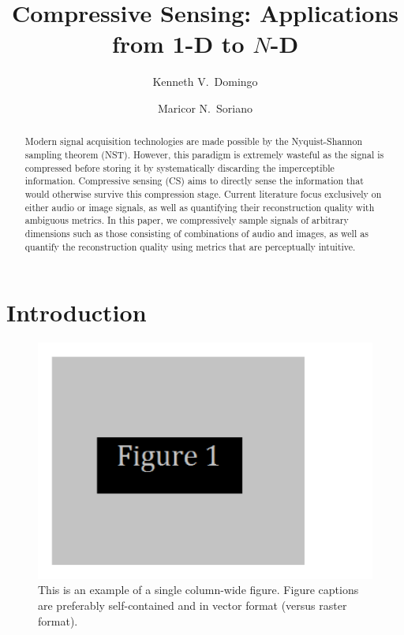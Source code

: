 \documentclass[10pt,a4paper,twoside]{article}
\begin{document}
\title{\TitleFont Compressive Sensing: Applications from 1-D to $N$-D}

\author[*\negthickspace]{Kenneth V.~Domingo}
\author[ ]{Maricor N.~Soriano
\lastauthorsep}


\begin{abstract}
\noindent
Modern signal acquisition technologies are made possible by the Nyquist-Shannon sampling theorem (NST). However, this paradigm is extremely wasteful as the signal is compressed before storing it by systematically discarding the imperceptible information. Compressive sensing (CS) aims to directly sense the information that would otherwise survive this compression stage. Current literature focus exclusively on either audio or image signals, as well as quantifying their reconstruction quality with ambiguous metrics. In this paper, we compressively sample signals of arbitrary dimensions such as those consisting of combinations of audio and images, as well as quantify the reconstruction quality using metrics that are perceptually intuitive.


\end{abstract}

\maketitle
\thispagestyle{titlestyle}

\section{Introduction}\label{sec:intro}

\begin{figure}[tb]
\centering
\includegraphics[width=0.3\linewidth]{figure1.pdf}
\caption{This is an example of a single column-wide figure. Figure captions are preferably self-contained and in vector format (versus raster format).}
\label{fig:plot1}
\end{figure}
\end{document}
